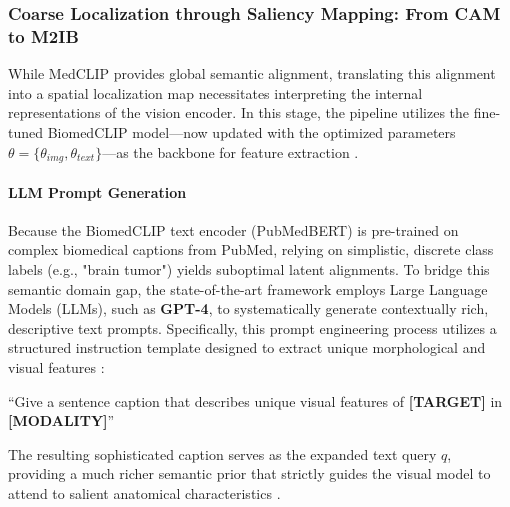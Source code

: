 \subsubsection{Coarse Localization through Saliency Mapping: From CAM to M2IB}
\label{sec:localization}
While MedCLIP provides global semantic alignment, translating this alignment into a spatial localization map necessitates interpreting the internal representations of the vision encoder. In this stage, the pipeline utilizes the fine-tuned BiomedCLIP model—now updated with the optimized parameters $\theta = \{\theta_{img}, \theta_{text}\}$—as the backbone for feature extraction \cite{medclipsam}.

\paragraph{LLM Prompt Generation} Because the BiomedCLIP text encoder (PubMedBERT) is pre-trained on complex biomedical captions from PubMed, relying on simplistic, discrete class labels (e.g., "brain tumor") yields suboptimal latent alignments. To bridge this semantic domain gap, the state-of-the-art framework employs Large Language Models (LLMs), such as \textbf{GPT-4}, to systematically generate contextually rich, descriptive text prompts. Specifically, this prompt engineering process utilizes a structured instruction template designed to extract unique morphological and visual features \cite{medclipsam}:
\begin{promptbox}
``Give a sentence caption that describes unique visual features of \textbf{[TARGET]} in \textbf{[MODALITY]}''
\end{promptbox}
The resulting sophisticated caption serves as the expanded text query $q$, providing a much richer semantic prior that strictly guides the visual model to attend to salient anatomical characteristics \cite{medclipsam}.

